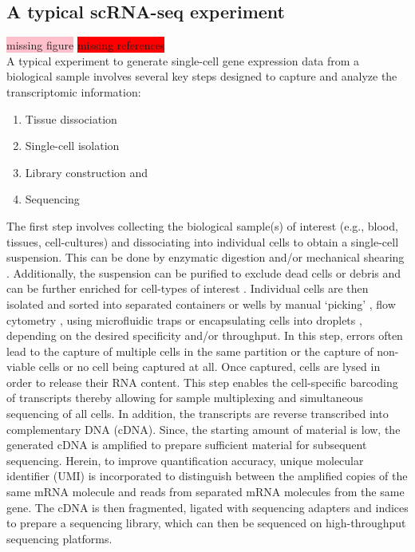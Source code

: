  \subsection{A typical scRNA-seq experiment}
 \colorbox{pink}{missing figure} \colorbox{red}{missing references}\\
\label{sec:scrna_typical}
A typical experiment to generate single-cell gene expression data from a biological sample involves several key steps designed to capture and analyze the transcriptomic information: 
\begin{enumerate}
\item Tissue dissociation
\item Single-cell isolation
\item Library construction and 
\item Sequencing 
\end{enumerate}

The first step involves collecting the biological sample(s) of interest (e.g., blood, tissues, cell-cultures) and dissociating into individual cells to obtain a single-cell suspension. This can be done by enzymatic digestion and/or mechanical shearing \textbf{\cite{vieira_braga_tissue_2019}}. Additionally, the suspension can be purified to exclude dead cells or debris and can be further enriched for cell-types of interest \textbf{\cite{kalisky_brief_2018}}. Individual cells are then isolated and sorted into separated containers or wells by manual ‘picking’ \textbf{\cite{tang_mrna-seq_2009,kalisky_brief_2018,guo_resolution_2010}}, flow cytometry \textbf{\cite{hayashi_single-cell_2010,jaitin_massively_2014}}, using microfluidic traps \textbf{\cite{kalisky_brief_2018,treutlein_reconstructing_2014,streets_microfluidic_2014}} or encapsulating cells into droplets \textbf{\cite{kalisky_brief_2018,klein_droplet_2015,macosko_highly_2015}}, depending on the desired specificity and/or throughput. In this step, errors often lead to the capture of multiple cells in the same partition or the capture of non-viable cells or no cell being captured at all. Once captured, cells are lysed in order to release their RNA content. This step enables the cell-specific barcoding of transcripts thereby allowing for sample multiplexing and simultaneous sequencing of all cells. In addition, the transcripts are reverse transcribed into complementary DNA (cDNA). Since, the starting amount of material is low, the generated cDNA is amplified to prepare sufficient material for subsequent sequencing. Herein, to improve quantification accuracy, unique molecular identifier (UMI) is incorporated to distinguish between the amplified copies of the same mRNA molecule and reads from separated mRNA molecules from the same gene. The cDNA is then fragmented, ligated with sequencing adapters and indices to prepare a sequencing library, which can then be sequenced on high-throughput sequencing platforms.

